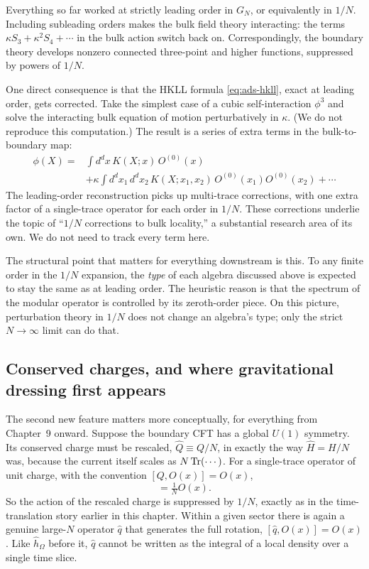 Everything so far worked at strictly leading order in $G_N$, or equivalently in $1/N$. Including subleading
orders makes the bulk field theory interacting: the terms $\kappa S_3+\kappa^2S_4+\cdots$ in the bulk action
switch back on. Correspondingly, the boundary theory develops nonzero connected three-point and higher
functions, suppressed by powers of $1/N$.

One direct consequence is that the HKLL formula \eqref{eq:ads-hkll}, exact at leading order, gets corrected.
Take the simplest case of a cubic self-interaction $\phi^3$ and solve the interacting bulk equation of motion
perturbatively in $\kappa$. (We do not reproduce this computation.) The result is a series of extra terms in the
bulk-to-boundary map:
\[
\begin{split}
\phi(X) ={}& \int d^dx\,K(X;x)\,O^{(0)}(x) \\
&+ \kappa\int d^dx_1\,d^dx_2\,K(X;x_1,x_2)\,O^{(0)}(x_1)O^{(0)}(x_2) + \cdots
\end{split}
\]
The leading-order reconstruction picks up multi-trace corrections, with one extra factor of a single-trace
operator for each order in $1/N$. These corrections underlie the topic of ``$1/N$ corrections to bulk
locality,'' a substantial research area of its own. We do not need to track every term here.

The structural point that matters for everything downstream is this. To any finite order in the $1/N$
expansion, the \emph{type} of each algebra discussed above is expected to stay the same as at leading order.
The heuristic reason is that the spectrum of the modular operator is controlled by its zeroth-order piece. On
this picture, perturbation theory in $1/N$ does not change an algebra's type; only the strict $N\to\infty$ limit
can do that.

\subsection*{Conserved charges, and where gravitational dressing first appears}

The second new feature matters more conceptually, for everything from Chapter~9 onward. Suppose the boundary
CFT has a global $U(1)$ symmetry. Its conserved charge must be rescaled, $\widehat Q\equiv Q/N$, in exactly the
way $\widehat H=H/N$ was, because the current itself scales as $N\operatorname{Tr}(\cdots)$. For a single-trace operator of
unit charge, with the convention $[Q,O(x)]=O(x)$,
\begin{equation}
[\widehat Q,O(x)]=\tfrac1N O(x) .
\label{eq:ads-charge}
\end{equation}
So the action of the rescaled charge is suppressed by $1/N$, exactly as in the time-translation story earlier
in this chapter. Within a given sector there is again a genuine large-$N$ operator $\hat q$ that generates the
full rotation, $[\hat q,O(x)]=O(x)$. Like $\hat h_\Omega$ before it, $\hat q$ cannot be written as the integral of
a local density over a single time slice.

